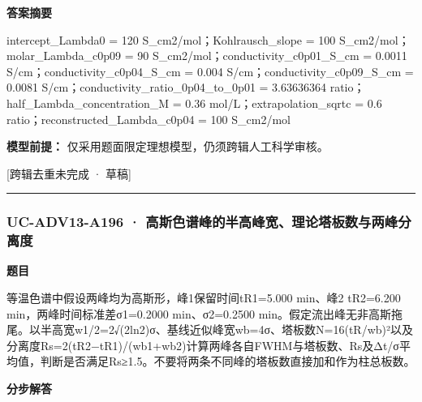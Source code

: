 \documentclass[UTF8,11pt,a4paper]{ctexart}
\begin{document}
\noindent\textbf{答案摘要}\par
intercept\_Lambda0 = 120 S\_cm2/mol；Kohlrausch\_slope = 100 S\_cm2/mol；molar\_Lambda\_c0p09 = 90 S\_cm2/mol；conductivity\_c0p01\_S\_cm = 0.0011 S/cm；conductivity\_c0p04\_S\_cm = 0.004 S/cm；conductivity\_c0p09\_S\_cm = 0.0081 S/cm；conductivity\_ratio\_0p04\_to\_0p01 = 3.63636364 ratio；half\_Lambda\_concentration\_M = 0.36 mol/L；extrapolation\_sqrtc = 0.6 ratio；reconstructed\_Lambda\_c0p04 = 100 S\_cm2/mol\par
\noindent\textbf{模型前提：}
仅采用题面限定理想模型，仍须跨辑人工科学审核。\par
\noindent\textcolor{red!65!black}{[跨辑去重未完成 · 草稿]} \par
\medskip\hrule\medskip
{}
\subsubsection*{UC-ADV13-A196 · 高斯色谱峰的半高峰宽、理论塔板数与两峰分离度}
\noindent\textbf{题目}\par
等温色谱中假设两峰均为高斯形，峰1保留时间tR1=5.000 min、峰2 tR2=6.200 min，两峰时间标准差σ1=0.2000 min、σ2=0.2500 min。假定流出峰无非高斯拖尾。以半高宽w1/2=2√(2ln2)σ、基线近似峰宽wb=4σ、塔板数N=16(tR/wb)²以及分离度Rs=2(tR2−tR1)/(wb1+wb2)计算两峰各自FWHM与塔板数、Rs及Δt/σ平均值，判断是否满足Rs≥1.5。不要将两条不同峰的塔板数直接加和作为柱总板数。\par
\medskip\noindent\textbf{分步解答}
\end{document}

